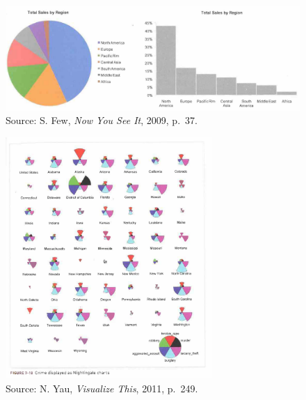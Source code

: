 \documentclass[
  letterpaper,
  DIV=11,
  numbers=noendperiod]{scrreprt}
\begin{document}
\hfill\break
\hfill\break
\hfill\break

\begin{figure}[H]

{\centering \includegraphics[width=1\textwidth,height=\textheight]{src/../images/piechart.png}

}

\caption{Source: S. Few, \emph{Now You See It}, 2009, p.~37.}

\end{figure}%

\hfill\break
\hfill\break
\hfill\break

\begin{figure}[H]

{\centering \includegraphics[width=0.7\textwidth,height=\textheight]{src/../images/Nightingale.png}

}

\caption{Source: N. Yau, \emph{Visualize This}, 2011, p.~249.}

\end{figure}%
\end{document}
